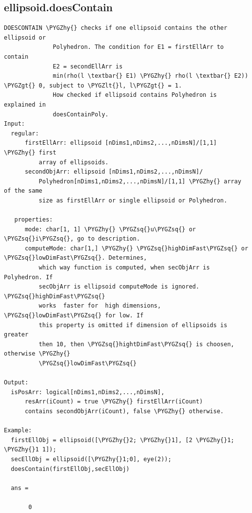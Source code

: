 \documentclass[letterpaper,10pt,english]{sphinxmanual}
\def\PYGZlt{\char`\<}
\def\PYGZgt{\char`\>}
\def\PYGZhy{\char`\-}
\def\PYGZsq{\char`\'}
\begin{document}
\subsection{ellipsoid.doesContain}
\label{chap_functions:ellipsoid-doescontain}
\begin{Verbatim}[commandchars=\\\{\}]
DOESCONTAIN \PYGZhy{} checks if one ellipsoid contains the other ellipsoid or
              Polyhedron. The condition for E1 = firstEllArr to contain
              E2 = secondEllArr is
              min(rho(l \textbar{} E1) \PYGZhy{} rho(l \textbar{} E2)) \PYGZgt{} 0, subject to \PYGZlt{}l, l\PYGZgt{} = 1.
              How checked if ellipsoid contains Polyhedron is explained in
              doesContainPoly.
Input:
  regular:
      firstEllArr: ellipsoid [nDims1,nDims2,...,nDimsN]/[1,1] \PYGZhy{} first
          array of ellipsoids.
      secondObjArr: ellipsoid [nDims1,nDims2,...,nDimsN]/
          Polyhedron[nDims1,nDims2,...,nDimsN]/[1,1] \PYGZhy{} array of the same
          size as firstEllArr or single ellipsoid or Polyhedron.

   properties:
      mode: char[1, 1] \PYGZhy{} \PYGZsq{}u\PYGZsq{} or \PYGZsq{}i\PYGZsq{}, go to description.
      computeMode: char[1,] \PYGZhy{} \PYGZsq{}highDimFast\PYGZsq{} or \PYGZsq{}lowDimFast\PYGZsq{}. Determines,
          which way function is computed, when secObjArr is Polyhedron. If
          secObjArr is ellipsoid computeMode is ignored. \PYGZsq{}highDimFast\PYGZsq{}
          works  faster for  high dimensions, \PYGZsq{}lowDimFast\PYGZsq{} for low. If
          this property is omitted if dimension of ellipsoids is greater
          then 10, then \PYGZsq{}hightDimFast\PYGZsq{} is choosen, otherwise \PYGZhy{}
          \PYGZsq{}lowDimFast\PYGZsq{}

Output:
  isPosArr: logical[nDims1,nDims2,...,nDimsN],
      resArr(iCount) = true \PYGZhy{} firstEllArr(iCount)
      contains secondObjArr(iCount), false \PYGZhy{} otherwise.

Example:
  firstEllObj = ellipsoid([\PYGZhy{}2; \PYGZhy{}1], [2 \PYGZhy{}1; \PYGZhy{}1 1]);
  secEllObj = ellipsoid([\PYGZhy{}1;0], eye(2));
  doesContain(firstEllObj,secEllObj)

  ans =

       0
\end{Verbatim}
\end{document}

